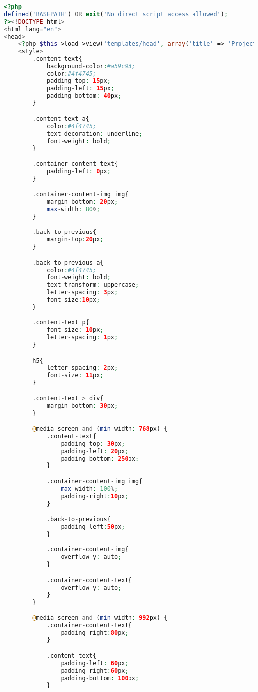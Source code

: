 



\begin{lstlisting}[language=php, caption=project\_details.php]
<?php
defined('BASEPATH') OR exit('No direct script access allowed');
?><!DOCTYPE html>
<html lang="en">
<head>
	<?php $this->load->view('templates/head', array('title' => 'Project Details')); ?>
	<style>
		.content-text{
			background-color:#a59c93;
			color:#4f4745;
			padding-top: 15px;
			padding-left: 15px;
			padding-bottom: 40px;
		}

		.content-text a{
			color:#4f4745;
			text-decoration: underline;
			font-weight: bold;
		}

		.container-content-text{
			padding-left: 0px;
		}

		.container-content-img img{
			margin-bottom: 20px;
			max-width: 80%;
		}

		.back-to-previous{
			margin-top:20px;
		}

		.back-to-previous a{
			color:#4f4745;
			font-weight: bold;
			text-transform: uppercase;
			letter-spacing: 3px;
			font-size:10px;
		}

		.content-text p{
			font-size: 10px;
			letter-spacing: 1px;
		}

		h5{
			letter-spacing: 2px;
			font-size: 11px;
		}

		.content-text > div{
			margin-bottom: 30px;
		}

		@media screen and (min-width: 768px) {
			.content-text{
				padding-top: 30px;
				padding-left: 20px;
				padding-bottom: 250px;
			}

			.container-content-img img{
				max-width: 100%;
				padding-right:10px;
			}

			.back-to-previous{
				padding-left:50px;
			}

			.container-content-img{
				overflow-y: auto;
			}

			.container-content-text{
				overflow-y: auto;
			}
		}

		@media screen and (min-width: 992px) {
			.container-content-text{
				padding-right:80px;
			}

			.content-text{
				padding-left: 60px;
				padding-right:60px;
				padding-bottom: 100px;
			}


\end{lstlisting}
